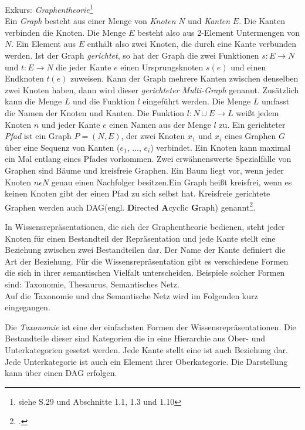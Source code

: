 Exkurs: \textit{Graphentheorie}\footnote{siehe \cite{STU09} S.29 und \cite{DIE20} Abschnitte 1.1, 1.3 und 1.10}\\
Ein \textit{Graph} besteht aus einer Menge von \textit{Knoten} $N$ und \textit{Kanten} $E$. Die Kanten verbinden die Knoten. Die Menge $E$ besteht also aus 2-Element Untermengen von $N$. Ein Element aus $E$ enthält also zwei Knoten, die durch eine Kante verbunden werden. Ist der Graph \textit{gerichtet}, so hat der Graph die zwei Funktionen $s:E\rightarrow N$ und $t:E\rightarrow N$ die jeder Kante $e$ einen Ursprungsknoten $s(e)$ und einen Endknoten $t(e)$ zuweisen. Kann der Graph mehrere Kanten zwischen denselben zwei Knoten haben, dann wird dieser \textit{gerichteter Multi-Graph} genannt. Zusätzlich kann die Menge $L$ und die Funktion $l$ eingeführt werden. Die Menge $L$ umfasst die Namen der Knoten und Kanten. Die Funktion $l:N\cup E\rightarrow L$ weißt jedem Knoten $n$ und jeder Kante $e$ einen Namen aus der Menge $l$ zu.
Ein gerichteter \textit{Pfad} ist ein Graph $P = (N, E)$, der zwei Knoten $x_1$ und $x_i$ eines Graphen $G$ über eine Sequenz von Kanten ($e_1$, $\dots$, $e_i$) verbindet. Ein Knoten kann maximal ein Mal entlang eines Pfades vorkommen. 
Zwei erwähnenswerte Spezialfälle von Graphen sind Bäume und kreisfreie Graphen. Ein Baum liegt vor, wenn jeder Knoten $n \epsilon N$ genau einen Nachfolger besitzen.\glqq Ein Graph heißt kreisfrei, wenn es keinen Knoten gibt der einen Pfad zu sich selbst hat. Kreisfreie gerichtete Graphen werden auch DAG(engl. \textbf{D}irected \textbf{A}cyclic \textbf{G}raph) genannt\grqq\footcite{STU09}. 

In Wissensrepräsentationen, die sich der Graphentheorie bedienen, steht jeder Knoten für einen Bestandteil der Repräsentation und jede Kante stellt eine Beziehung zwischen zwei Bestandteilen dar. Der Name der Kante definiert die Art der Beziehung. Für die Wissensrepräsentation gibt es verschiedene Formen die sich in ihrer semantischen Vielfalt unterscheiden. Beispiele solcher Formen sind: Taxonomie, Thesaurus, Semantisches Netz.\\ %
Auf die Taxonomie und das Semantische Netz wird im Folgenden kurz eingegangen.
 
Die \textit{Taxonomie} ist eine der einfachsten Formen der Wissensrepräsentationen. Die Bestandteile dieser sind Kategorien die in eine Hierarchie aus Ober- und Unterkategorien gesetzt werden. Jede Kante stellt eine \glqq ist auch \grqq Beziehung dar. Jede Unterkategorie ist auch ein Element ihrer Oberkategorie. Die Darstellung kann über einen DAG erfolgen.

